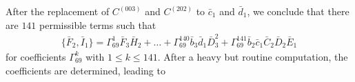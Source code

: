 \documentclass[10pt]{amsart}
\theoremstyle{definition}
\theoremstyle{corollary}
\theoremstyle{remark}
\theoremstyle{conclusion}
\begin{document}
After the replacement of $C^{(003)}$ and $C^{(202)}$ to $\bar{c}_1$ and $\bar{d}_1$, we conclude that there are $141$ permissible terms such that  
\begin{align*}
    \{\bar{F}_2,\bar{I}_1\} = \Gamma_{69}^1   \bar{F}_3 \bar{H}_2 +\ldots + \Gamma_{69}^{140} \bar{b}_3 \bar{d}_1 \bar{D}_3^2   +\Gamma_{69}^{141}    \bar{b}_2 \bar{c}_1 \bar{C}_2 \bar{D}_2 \bar{E}_1  
\end{align*} 
  for coefficients $\Gamma_{69}^k$  with $1 \leq k \leq 141$.   After a heavy but routine computation, the coefficients are determined, leading to 
\end{document}
